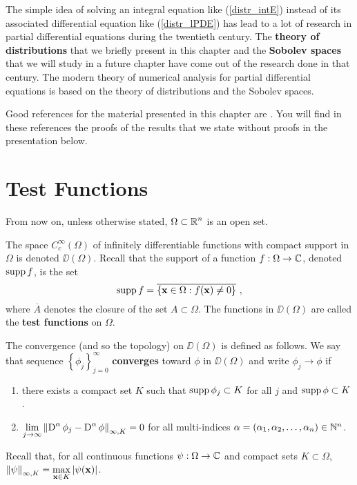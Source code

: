 The simple idea of solving an integral equation like
(\ref{distr_intE}) instead of its associated differential equation
like (\ref{distr_lPDE}) has lead to a lot of research in partial
differential equations during the twentieth century.  The
{\bfseries theory of distributions} that we
briefly present in this chapter and the
{\bfseries Sobolev spaces} that we will
study in a future chapter have come out of the research done in
that century.  The modern theory of numerical analysis for partial
differential equations is based on the theory of distributions and the
Sobolev spaces.

Good references for the material presented in this chapter are
\cite{ReeSim,RuFA}.  You will find in these references the proofs of
the results that we state without proofs in the presentation below.

\section{Test Functions} \label{SectTestFnct}

From now on, unless otherwise stated, $\displaystyle \Omega \subset \mathbb{R}^n$ is an
open set.

The space $\displaystyle C_c^\infty(\Omega)$ of infinitely
differentiable functions with compact support in $\Omega$ is denoted
$\DD(\Omega)$.
Recall that the support of a function $f:\Omega \rightarrow \mathbb{C}$, denoted
$\operatorname{supp} f$, is the set
\[
\operatorname{supp} f = \overline{\left\{ \mathbf{x} \in \Omega : f(\mathbf{x}) \neq 0 \right\}} \ ,
\]
where $\overline{A}$ denotes the closure of the set $A\subset \Omega$.
The functions in $\DD(\Omega)$ are called the
{\bfseries test functions} on $\Omega$. 

The convergence (and so the topology) on $\DD(\Omega)$ is defined as
follows.  We say that sequence
$\displaystyle \left\{\phi_j\right\}_{j=0}^\infty$
{\bfseries converges}
toward $\phi$ in $\DD(\Omega)$ and write
$\displaystyle \phi_j \rightarrow \phi$ if
\begin{enumerate}
\item there exists a compact set $K$ such that
$\operatorname{supp} \phi_j \subset K$ for all $j$ and $\operatorname{supp} \phi \subset K$.
\item $\displaystyle \lim_{j\rightarrow \infty}
\left\| \operatorname{D}^\alpha \phi_j - \operatorname{D}^\alpha \phi\right\|_{\infty,K} =0$
for all multi-indices
$\alpha = (\alpha_1,\alpha_2, \ldots, \alpha_n) \in \mathbb{N}^n$.
\end{enumerate}
Recall that, for all continuous functions $\psi:\Omega \to \mathbb{C}$ and
compact sets $K\subset \Omega$,
$\displaystyle \left\| \psi \right\|_{\infty,K} =
\max_{\mathbf{x}\in K} \left| \psi(\mathbf{x}) \right|$.

